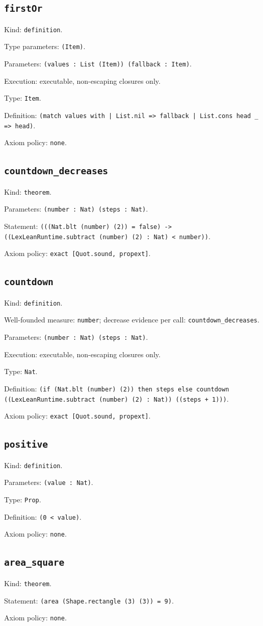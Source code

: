 \documentclass[11pt]{article}
\begin{document}
\subsection*{\texttt{firstOr}}
\noindent Kind: \texttt{definition}.\par
\noindent Type parameters: \texttt{(Item)}.\par
\noindent Parameters: \texttt{(values : List (Item)) (fallback : Item)}.\par
\noindent Execution: executable, non-escaping closures only.\par
\noindent Type: \texttt{Item}.\par
\noindent Definition: \texttt{(match values with | List.nil => fallback | List.cons head \_ => head)}.\par
\noindent Axiom policy: \texttt{none}.\par
\subsection*{\texttt{countdown\_decreases}}
\noindent Kind: \texttt{theorem}.\par
\noindent Parameters: \texttt{(number : Nat) (steps : Nat)}.\par
\noindent Statement: \texttt{(((Nat.blt (number) (2)) = false) -> ((LexLeanRuntime.subtract (number) (2) : Nat) < number))}.\par
\noindent Axiom policy: \texttt{exact [Quot.sound, propext]}.\par
\subsection*{\texttt{countdown}}
\noindent Kind: \texttt{definition}.\par
\noindent Well-founded measure: \texttt{number}; decrease evidence per call: \texttt{countdown\_decreases}.\par
\noindent Parameters: \texttt{(number : Nat) (steps : Nat)}.\par
\noindent Execution: executable, non-escaping closures only.\par
\noindent Type: \texttt{Nat}.\par
\noindent Definition: \texttt{(if (Nat.blt (number) (2)) then steps else countdown ((LexLeanRuntime.subtract (number) (2) : Nat)) ((steps + 1)))}.\par
\noindent Axiom policy: \texttt{exact [Quot.sound, propext]}.\par
\subsection*{\texttt{positive}}
\noindent Kind: \texttt{definition}.\par
\noindent Parameters: \texttt{(value : Nat)}.\par
\noindent Type: \texttt{Prop}.\par
\noindent Definition: \texttt{(0 < value)}.\par
\noindent Axiom policy: \texttt{none}.\par
\subsection*{\texttt{area\_square}}
\noindent Kind: \texttt{theorem}.\par
\noindent Statement: \texttt{(area (Shape.rectangle (3) (3)) = 9)}.\par
\noindent Axiom policy: \texttt{none}.\par
\end{document}
